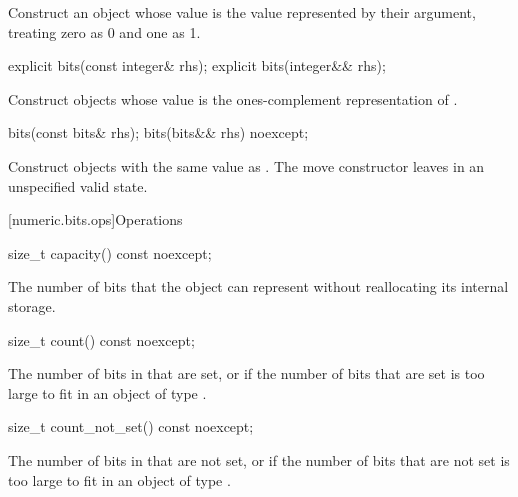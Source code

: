 \begin{itemdescr}
\effects Construct an object whose value is the value represented by their argument, treating zero as 0 and one as 1.
\end{itemdescr}

\begin{itemdecl}
explicit bits(const integer& rhs);
explicit bits(integer&& rhs);
\end{itemdecl}

\begin{itemdescr}
\effects Construct objects whose value is the ones-complement representation of .
\end{itemdescr}

\begin{itemdecl}
bits(const bits& rhs);
bits(bits&& rhs) noexcept;
\end{itemdecl}

\begin{itemdescr}
\effects Construct objects with the same value as . The move constructor leaves  in an unspecified valid state.
\end{itemdescr}

[numeric.bits.ops]{Operations}

\begin{itemdecl}
size_t capacity() const noexcept;
\end{itemdecl}

\begin{itemdescr}
\returns The number of bits that the object can represent without reallocating its internal storage.
\end{itemdescr}

\begin{itemdecl}
size_t count() const noexcept;    
\end{itemdecl}

\begin{itemdescr}
\returns The number of bits in  that are set, or  if the number of bits that are set is too large to fit in an object of type .
\end{itemdescr}

\begin{itemdecl}
size_t count_not_set() const noexcept;	
\end{itemdecl}

\begin{itemdescr}
\returns The number of bits in  that are not set, or  if the number of bits that are not set is too large to fit in an object of type .
\end{itemdescr}


